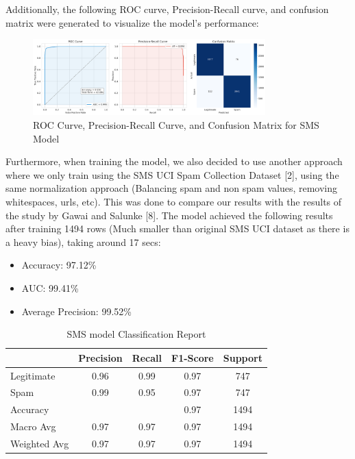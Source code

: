 \documentclass{article}
\begin{document}
\noindent
Additionally, the following ROC curve, Precision-Recall curve, and confusion matrix were generated to visualize the model's performance:
\begin{figure}[htbp]
    \centering
    \includegraphics[width=0.8\textwidth]{../analysis/sms/sms_model_performance.png}
    \caption{ROC Curve, Precision-Recall Curve, and Confusion Matrix for SMS Model}
    \label{fig:roc_curve_2}
\end{figure}

\noindent
Furthermore, when training the model, we also decided to use another approach where we only train using the SMS UCI Spam Collection Dataset [2], using the same normalization approach (Balancing spam and non spam values, removing whitespaces, urls, etc). This was done to compare our results with the results of the study by Gawai and Salunke [8]. The model achieved the following results after training 1494 rows (Much smaller than original SMS UCI dataset as there is a heavy bias), taking around 17 secs: 
\begin{itemize}
    \item Accuracy: 97.12\%
    \item AUC: 99.41\%
    \item Average Precision: 99.52\%
\end{itemize}

\begin{table}[htbp]
    \centering
    \caption{SMS model Classification Report}
    \begin{tabular}{l c c c c}
    \toprule
     & Precision & Recall & F1-Score & Support \\
    \midrule
    Legitimate & 0.96 & 0.99 & 0.97 & 747 \\
    Spam & 0.99 & 0.95 & 0.97 & 747 \\
    \midrule
    Accuracy & & & 0.97 & 1494 \\
    Macro Avg & 0.97 & 0.97 & 0.97 & 1494 \\
    Weighted Avg & 0.97 & 0.97 & 0.97 & 1494 \\
    \bottomrule
    \end{tabular}
    \label{tab:classification_report_3}
\end{table}
\end{document}
